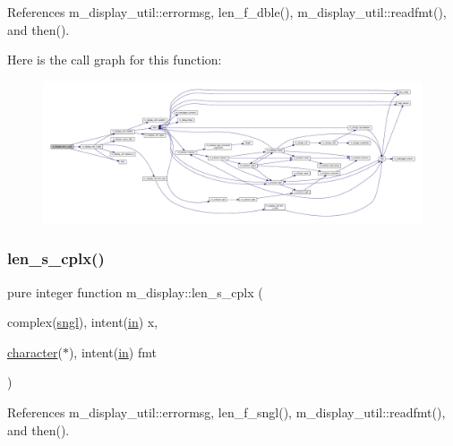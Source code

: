 References m\+\_\+display\+\_\+util\+::errormsg, len\+\_\+f\+\_\+dble(), m\+\_\+display\+\_\+util\+::readfmt(), and then().

Here is the call graph for this function\+:
\nopagebreak
\begin{figure}[H]
\begin{center}
\leavevmode
\includegraphics[width=350pt]{namespacem__display_ace35690c2f36e28f07336cc7dcff47f4_cgraph}
\end{center}
\end{figure}
\mbox{\label{namespacem__display_a7b573fb0cba7c7c954a820cdfe1c7968}} 
\subsubsection{\texorpdfstring{len\+\_\+s\+\_\+cplx()}{len\_s\_cplx()}}
{\footnotesize\ttfamily pure integer function m\+\_\+display\+::len\+\_\+s\+\_\+cplx (\begin{DoxyParamCaption}\item[{complex(\hyperlink{namespacem__display_a2ac86bc535c3ccc5947dbb3109c666b5}{sngl}), intent(\hyperlink{M__journal_83_8txt_afce72651d1eed785a2132bee863b2f38}{in})}]{x,  }\item[{\hyperlink{option__stopwatch_83_8txt_abd4b21fbbd175834027b5224bfe97e66}{character}($\ast$), intent(\hyperlink{M__journal_83_8txt_afce72651d1eed785a2132bee863b2f38}{in})}]{fmt }\end{DoxyParamCaption})\hspace{0.3cm}{\ttfamily [private]}}



References m\+\_\+display\+\_\+util\+::errormsg, len\+\_\+f\+\_\+sngl(), m\+\_\+display\+\_\+util\+::readfmt(), and then().

